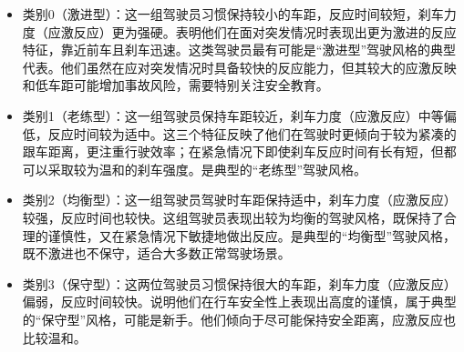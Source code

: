 \documentclass[withoutpreface,bwprint]{cumcmthesis}
\begin{document}
    \begin{itemize}
        \item 类别0（激进型）：这一组驾驶员习惯保持较小的车距，反应时间较短，刹车力度（应激反应）更为强硬。表明他们在面对突发情况时表现出更为激进的反应特征，靠近前车且刹车迅速。这类驾驶员最有可能是“激进型”驾驶风格的典型代表。他们虽然在应对突发情况时具备较快的反应能力，但其较大的应激反映和低车距可能增加事故风险，需要特别关注安全教育。
        
        \item 类别1（老练型）：这一组驾驶员保持车距较近，刹车力度（应激反应）中等偏低，反应时间较为适中。这三个特征反映了他们在驾驶时更倾向于较为紧凑的跟车距离，更注重行驶效率；在紧急情况下即使刹车反应时间有长有短，但都可以采取较为温和的刹车强度。是典型的“老练型”驾驶风格。
        
        \item 类别2（均衡型）：这一组驾驶员驾驶时车距保持适中，刹车力度（应激反应）较强，反应时间也较快。这组驾驶员表现出较为均衡的驾驶风格，既保持了合理的谨慎性，又在紧急情况下敏捷地做出反应。是典型的“均衡型”驾驶风格，既不激进也不保守，适合大多数正常驾驶场景。
        
        \item 类别3（保守型）：这两位驾驶员习惯保持很大的车距，刹车力度（应激反应）偏弱，反应时间较快。说明他们在行车安全性上表现出高度的谨慎，属于典型的“保守型”风格，可能是新手。他们倾向于尽可能保持安全距离，应激反应也比较温和。
        
        
    \end{itemize}





    
    
\end{document}
